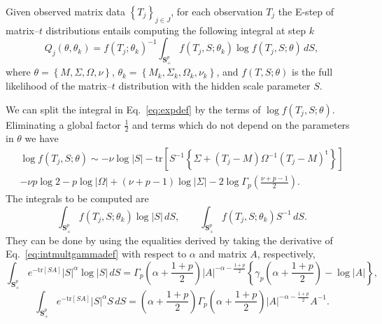 \documentclass[english,listof=totoc]{scrartcl}
\begin{document}
Given observed matrix data $\left\{T_j\right\}_{j\in J}$, for each observation $T_j$ the E-step of matrix--$t$ distributions entails computing the following integral at step $k$
\begin{equation}
Q_j(\theta,\theta_k)=f(T_j;\theta_k)^{-1}\int_{\mathbf{S}_+^p}f(T_{j},S;\theta_k)\log f\left(T_{j},S;\theta\right)\,dS,\label{eq:expdef}
\end{equation}
where $\theta=\left\{M,\Sigma,\Omega,\nu\right\}$, $\theta_k=\left\{M_k,\Sigma_k,\Omega_k,\nu_k\right\}$, and $f(T,S;\theta)$ is the full likelihood of the matrix--$t$ distribution with the hidden scale parameter $S$.

We can split the integral in Eq.~\eqref{eq:expdef} by the terms of $\log f(T_{j},S;\theta)$. Eliminating a global factor $\frac{1}{2}$ and terms which do not depend on the parameters in $\theta$ we have
\begin{equation}
\begin{split}\log f(T_{j},S;\theta)\sim -\nu\log|S|-\textrm{tr}\left[S^{-1}\left\{\Sigma+(T_j-M)\Omega^{-1}(T_j-M)^{\textrm{t}}\right\}\right]\\
-\nu p\log2-p\log |\Omega|+(\nu+p-1)\log |\Sigma|-2\log\Gamma_{p}\left(\frac{\nu+p-1}{2}\right).
\end{split}\label{eq:logf}
\end{equation}
The integrals to be computed are
\begin{equation}
\int_{\mathbf{S}_+^p}f(T_j,S;\theta_k)\log |S|\,dS, \qquad 
\int_{\mathbf{S}_+^p}f(T_j,S;\theta_k) S^{-1}\,dS.
\end{equation}
They can be done by using the equalities derived by taking the derivative of Eq.~\eqref{eq:intmultgammadef} with respect to $\alpha$ and matrix $A$, respectively,
\begin{equation}
\int_{\mathbf{S}_+^p}e^{-\textrm{tr}\left[SA\right]}|S|^{\alpha}\log |S|\,dS=\Gamma_{p}\left(\alpha+\frac{1+p}{2}\right)|A|^{-\alpha-\frac{1+p}{2}}\left\{\gamma_{p}\left(\alpha+\frac{1+p}{2}\right)-\log |A|\right\},\label{eq:intderivative1}
\end{equation}
\begin{equation}
\int_{\mathbf{S}_+^p}e^{-\textrm{tr}\left[SA\right]}|S|^{\alpha}S\,dS=\left(\alpha+\frac{1+p}{2}\right)\Gamma_{p}\left(\alpha+\frac{1+p}{2}\right)|A|^{-\alpha-\frac{1+p}{2}}A^{-1}.\label{eq:intderivative2}
\end{equation}
\end{document}
